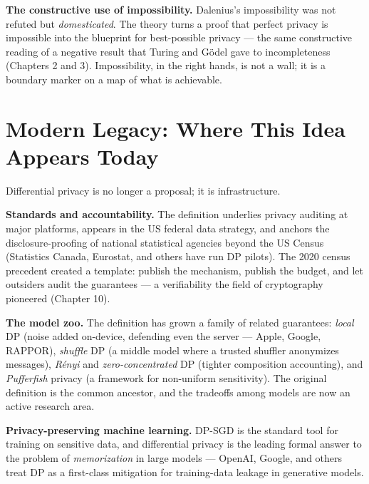 \textbf{The constructive use of impossibility.} Dalenius's impossibility was not refuted but \emph{domesticated}. The theory turns a proof that perfect privacy is impossible into the blueprint for best-possible privacy --- the same constructive reading of a negative result that Turing and G\"odel gave to incompleteness (Chapters 2 and 3). Impossibility, in the right hands, is not a wall; it is a boundary marker on a map of what is achievable.

\section{Modern Legacy: Where This Idea Appears Today}
\label{sec:dp:legacy}

Differential privacy is no longer a proposal; it is infrastructure. 

\textbf{Standards and accountability.} The definition underlies privacy auditing at major platforms, appears in the US federal data strategy, and anchors the disclosure-proofing of national statistical agencies beyond the US Census (Statistics Canada, Eurostat, and others have run DP pilots).  The 2020 census precedent created a template: publish the mechanism, publish the budget, and let outsiders audit the guarantees --- a verifiability the field of cryptography pioneered (Chapter 10).

\textbf{The model zoo.} The definition has grown a family of related guarantees: \emph{local} DP (noise added on-device, defending even the server --- Apple, Google, RAPPOR), \emph{shuffle} DP (a middle model where a trusted shuffler anonymizes messages), \emph{R\'enyi} and \emph{zero-concentrated} DP (tighter composition accounting), and \emph{Pufferfish} privacy (a framework for non-uniform sensitivity).  The original definition is the common ancestor, and the tradeoffs among models are now an active research area.

\textbf{Privacy-preserving machine learning.} DP-SGD is the standard tool for training on sensitive data, and differential privacy is the leading formal answer to the problem of \emph{memorization} in large models --- OpenAI, Google, and others treat DP as a first-class mitigation for training-data leakage in generative models. 

